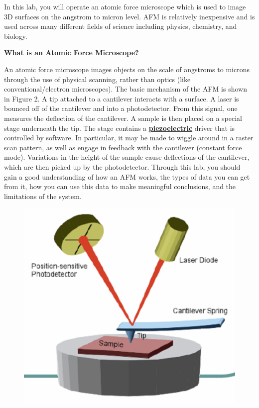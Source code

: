 \documentclass{../lab}
\begin{document}
In this lab, you will operate an atomic force microscope which is used to image 3D surfaces on the angstrom to micron level.  AFM is relatively inexpensive and is used across many different fields of science including physics, chemistry, and biology.

\noindent\textbf{What is an Atomic Force Microscope?}

An atomic force microscope images objects on the scale of angstroms to microns through the use of physical scanning, rather than optics (like conventional/electron microscopes).  The basic mechanism of the AFM is shown in Figure 2.  A tip attached to a cantilever interacts with a surface. A laser is bounced off of the cantilever and into a photodetector. From this signal, one measures the deflection of the cantilever. A sample is then placed on a special stage underneath the tip. The stage contains a \href{https://en.wikipedia.org/wiki/Piezoelectricity}{\textbf{piezoelectric}} driver that is controlled by software. In particular, it may be made to wiggle around in a raster scan pattern, as well as engage in feedback with the cantilever (constant force mode). Variations in the height of the sample cause deflections of the cantilever, which are then picked up by the photodetector.  Through this lab, you should gain a good understanding of how an AFM works, the types of data you can get from it, how you can use this data to make meaningful conclusions, and the limitations of the system.

\begin{figure}[h]
    \centering
    \href{http://experimentationlab.berkeley.edu/sites/default/files/AFMImages/2_0.png}{\includegraphics[width=0.5\linewidth]{images/2_0.png}}
    \caption{}
    \label{fig:2_0}
\end{figure}
\end{document}
